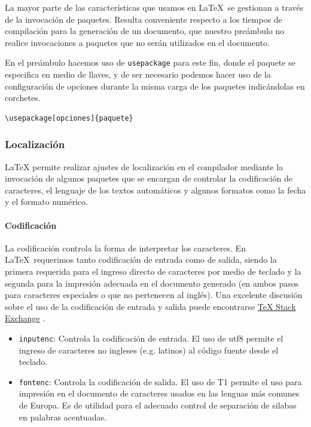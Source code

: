 \documentclass[12pt]{article}
\begin{document}
La mayor parte de las características que usamos en \LaTeX \ se gestionan a través de la invocación de paquetes. Resulta conveniente respecto a los tiempos de compilación para la generación de un documento, que nuestro preámbulo no realice invocaciones a paquetes que no serán utilizados en el documento.

En el preámbulo hacemos uso de \verb-usepackage- para este fin, donde el paquete se especifica en medio de llaves, y de ser necesario podemos hacer uso de la configuración de opciones durante la misma carga de los paquetes indicándolas en corchetes.

\begin{verbatim}
\usepackage[opciones]{paquete}
\end{verbatim}


\subsubsection{Localización}

LaTeX permite realizar ajustes de localización en el compilador mediante la invocación de algunos paquetes que se encargan de controlar la codificación de caracteres, el lenguaje de los textos automáticos y algunos formatos como la fecha y el formato numérico.

\paragraph{Codificación}

La codificación controla la forma de interpretar los caracteres. En \LaTeX \ requerimos tanto codificación de entrada como de salida, siendo la primera requerida para el ingreso directo de caracteres por medio de teclado y la segunda para la impresión adecuada en el documento generado (en ambos pasos para caracteres especiales o que no pertenecen al inglés). Una excelente discusión sobre el uso de la codificación de entrada y salida puede encontrarse \href{http://tex.stackexchange.com/questions/44694/fontenc-vs-inputenc}{TeX Stack Exchange} \cite{Stack2016}.

\begin{itemize}
\item \verb-inputenc-: Controla la codificación de entrada. El uso de utf8 permite el ingreso de caracteres no ingleses (e.g. latinos) al código fuente desde el teclado.
\item \verb-fontenc-: Controla la codificación de salida. El uso de T1 permite el uso para impresión en el documento de caracteres usados en las lenguas más comunes de Europa. Es de utilidad para el adecuado control de separación de silabas en palabras acentuadas.
\end{itemize}
\end{document}
